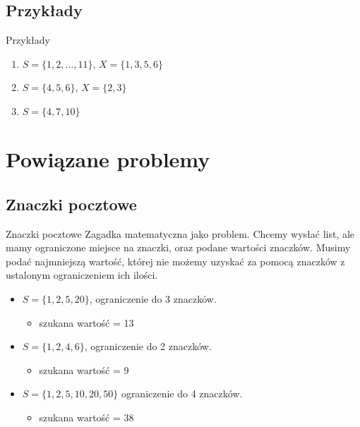 \documentclass{beamer}
\begin{document}
	\subsection{Przykłady}
		\begin{frame}{Przykłady}
			\begin{enumerate}
				\item $ S = \lbrace 1,2,...,11 \rbrace $, $ X = \lbrace 1,3,5,6 \rbrace $
				\pause \item $ S = \lbrace 4,5,6 \rbrace $, $ X = \lbrace 2,3 \rbrace $
				\pause \item $ S =  \lbrace 4,7,10 \rbrace $
			\end{enumerate}						
		\end{frame}
		
\section{Powiązane problemy}
	\subsection{Znaczki pocztowe}
		\begin{frame}
			\begin{block}{Znaczki pocztowe}
                Zagadka matematyczna jako problem.
                Chcemy wysłać list, ale mamy ograniczone miejsce na znaczki, oraz podane wartości znaczków.
                Musimy podać najmniejszą wartość, której nie możemy uzyskać za pomocą znaczków z ustalonym ograniczeniem ich ilości.
                \begin{itemize}
				    \pause \item $ S = \lbrace 1, 2, 5, 20 \rbrace $, ograniczenie do 3 znaczków.
                        \begin{itemize}
                            \item szukana wartość = 13
                        \end{itemize}
				    \pause \item $ S = \lbrace 1, 2, 4, 6 \rbrace $, ograniczenie do 2 znaczków.
                        \begin{itemize}
                            \item szukana wartość = 9
                        \end{itemize}
				    \pause \item $ S =  \lbrace 1, 2, 5, 10, 20, 50 \rbrace $ ograniczenie do 4 znaczków.
                        \begin{itemize}
                            \item szukana wartość = 38
                        \end{itemize}
                \end{itemize}
			\end{block}
		\end{frame}
		
\end{document}
